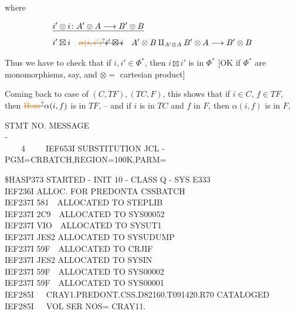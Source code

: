
where

\[
\begin{aligned}
&\deleted{i'\otimes i\colon A'\otimes A\longrightarrow B'\otimes B}\\
&i'\boxtimes i\quad \deleted{\unsure{\alpha(i,i')}}\deleted{i'\boxtimes i}\quad A'\otimes B\amalg_{A'\otimes A}B'\otimes A\longrightarrow B'\otimes B
\end{aligned}
\]

 Thus we have to check that if $i,i'\in\Phi^{*}$, then $i\boxtimes i'$ is in $\Phi^{*}$ [OK if $\Phi^{*}$ are monomorphisms, say, and $\otimes=$ cartesian product]


Coming back to case of $(C,TF),(TC,F)$, this shows that if $i\in C$, $f\in TF$, then $\deleted{\unsure{\mathrm{Hom}}}\alpha(i,f)$ is in $TF$, -- and if $i$ is in $TC$ and $f$ in $F$, then $\alpha(i,f)$ is in $F$,


{\scriptsize\ttfamily STMT NO. MESSAGE\\
-\\
~~~~4~~~~~IEF653I SUBSTITUTION JCL - PGM=CRBATCH,REGION=100K,PARM=}

{\scriptsize\ttfamily \$HASP373 STARTED - INIT 10 - CLASS Q - SYS E333\\
IEF236I ALLOC. FOR PREDONTA CSSBATCH\\
IEF237I 581~~ALLOCATED TO STEPLIB\\
IEF237I 2C9~~ALLOCATED TO SYS00052\\
IEF237I VIO~~ALLOCATED TO SYSUT1\\
IEF237I JES2 ALLOCATED TO SYSUDUMP\\
IEF237I 59F~~ALLOCATED TO CRJIF\\
IEF237I JES2 ALLOCATED TO SYSIN\\
IEF237I 59F~~ALLOCATED TO SYS00002\\
IEF237I 59F~~ALLOCATED TO SYS00001\\
IEF285I~~~CRAY1.PREDONT.CSS.D82160.T091420.R70 \quad CATALOGED\\
IEF285I~~~VOL SER NOS= CRAY11.}

